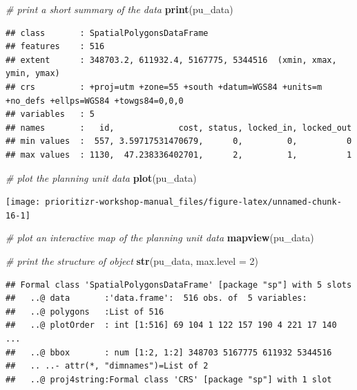 \documentclass[12pt,]{book}
\newenvironment{Shaded}{\begin{snugshade}}{\end{snugshade}}
\newcommand{\KeywordTok}[1]{\textcolor[rgb]{0.13,0.29,0.53}{\textbf{#1}}}
\newcommand{\DataTypeTok}[1]{\textcolor[rgb]{0.13,0.29,0.53}{#1}}
\newcommand{\DecValTok}[1]{\textcolor[rgb]{0.00,0.00,0.81}{#1}}
\newcommand{\CommentTok}[1]{\textcolor[rgb]{0.56,0.35,0.01}{\textit{#1}}}
\newcommand{\NormalTok}[1]{#1}
\begin{document}
\begin{Shaded}
\begin{Highlighting}[]
\CommentTok{# print a short summary of the data}
\KeywordTok{print}\NormalTok{(pu_data)}
\end{Highlighting}
\end{Shaded}

\begin{verbatim}
## class       : SpatialPolygonsDataFrame 
## features    : 516 
## extent      : 348703.2, 611932.4, 5167775, 5344516  (xmin, xmax, ymin, ymax)
## crs         : +proj=utm +zone=55 +south +datum=WGS84 +units=m +no_defs +ellps=WGS84 +towgs84=0,0,0 
## variables   : 5
## names       :   id,             cost, status, locked_in, locked_out 
## min values  :  557, 3.59717531470679,      0,         0,          0 
## max values  : 1130,  47.238336402701,      2,         1,          1
\end{verbatim}

\begin{Shaded}
\begin{Highlighting}[]
\CommentTok{# plot the planning unit data}
\KeywordTok{plot}\NormalTok{(pu_data)}
\end{Highlighting}
\end{Shaded}

\begin{center}\texttt{[image: prioritizr-workshop-manual\_files/figure-latex/unnamed-chunk-16-1]} \end{center}

\begin{Shaded}
\begin{Highlighting}[]
\CommentTok{# plot an interactive map of the planning unit data}
\KeywordTok{mapview}\NormalTok{(pu_data)}
\end{Highlighting}
\end{Shaded}

\begin{Shaded}
\begin{Highlighting}[]
\CommentTok{# print the structure of object}
\KeywordTok{str}\NormalTok{(pu_data, }\DataTypeTok{max.level =} \DecValTok{2}\NormalTok{)}
\end{Highlighting}
\end{Shaded}

\begin{verbatim}
## Formal class 'SpatialPolygonsDataFrame' [package "sp"] with 5 slots
##   ..@ data       :'data.frame':  516 obs. of  5 variables:
##   ..@ polygons   :List of 516
##   ..@ plotOrder  : int [1:516] 69 104 1 122 157 190 4 221 17 140 ...
##   ..@ bbox       : num [1:2, 1:2] 348703 5167775 611932 5344516
##   .. ..- attr(*, "dimnames")=List of 2
##   ..@ proj4string:Formal class 'CRS' [package "sp"] with 1 slot
\end{verbatim}
\end{document}
